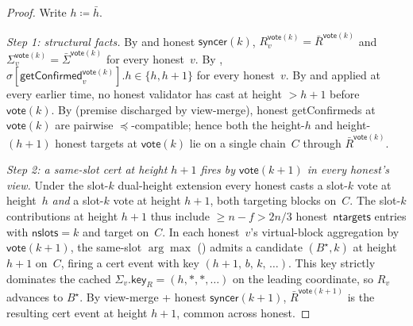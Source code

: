 \ifx\litemode\undefined\documentclass{article}\fi
\newcommand{\ntargets}{\mathsf{ntargets}}
\newcommand{\nslots}{\mathsf{nslots}}
\newcommand{\key}{\mathsf{key}}
\newcommand{\syncer}{\mathsf{syncer}}
\newcommand{\vote}{\mathsf{vote}}
\newcommand{\comm}[1]{\bar{#1}}
\newcommand{\getConfirmed}{\textsf{getConfirmed}\xspace}
\theoremstyle{plain}
\theoremstyle{definition}
\theoremstyle{remark}
\begin{document}
\begin{proof}
Write $h \coloneqq \comm{h}$.

\emph{Step 1: structural facts.}
By  and honest $\syncer(k)$, $R_v^{\vote(k)} = \comm{R}^{\vote(k)}$ and $\Sigma_v^{\vote(k)} = \comm{\Sigma}^{\vote(k)}$ for every honest~$v$. By , $\sigma[\getConfirmed_v^{\vote(k)}].h \in \{h, h+1\}$ for every honest~$v$. By  and  applied at every earlier time, no honest validator has cast at height $>h+1$ before $\vote(k)$. By  (premise discharged by view-merge), honest \getConfirmed{}s at $\vote(k)$ are pairwise $\preceq$-compatible; hence both the height-$h$ and height-$(h+1)$ honest targets at $\vote(k)$ lie on a single chain~$C$ through $\comm{R}^{\vote(k)}$.

\emph{Step 2: a same-slot cert at height $h+1$ fires by $\vote(k+1)$ in every honest's view.}
Under the slot-$k$ dual-height extension every honest casts a slot-$k$ vote at height~$h$ \emph{and} a slot-$k$ vote at height $h+1$, both targeting blocks on~$C$. The slot-$k$ contributions at height $h+1$ thus include $\geq n - f > 2n/3$ honest~$\ntargets$ entries with $\nslots = k$ and target on~$C$. In each honest~$v$'s virtual-block aggregation by $\vote(k+1)$, the same-slot $\arg\max$ () admits a candidate $(B^\star, k)$ at height $h+1$ on~$C$, firing a cert event with key $(h+1,\, b,\, k,\, \ldots)$. This key strictly dominates the cached $\Sigma_v.\key_R = (h, *, *, \ldots)$ on the leading coordinate, so $R_v$ advances to $B^\star$. By view-merge + honest $\syncer(k+1)$, $\comm{R}^{\vote(k+1)}$ is the resulting cert event at height $h+1$, common across honest.


\end{proof}
\end{document}
